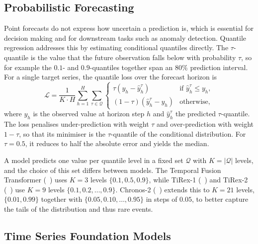 \subsection{Probabilistic Forecasting}
\label{sec:rw_quantiles}

Point forecasts do not express how uncertain a prediction is, which is essential for decision making and for downstream tasks such as anomaly detection. Quantile regression addresses this by estimating conditional quantiles directly. The $\tau$-quantile is the value that the future observation falls below with probability $\tau$, so for example the $0.1$- and $0.9$-quantiles together span an $80\%$ prediction interval. For a single target series, the quantile loss over the forecast horizon is
\begin{equation}
	\mathcal{L} = \frac{1}{K \cdot H} \sum_{h=1}^{H} \sum_{\tau \in \mathcal{Q}}
	\begin{cases}
		\tau \left(y_h - \hat{y}_h^{\tau}\right) & \text{if } \hat{y}_h^{\tau} \le y_h, \\
		(1 - \tau) \left(\hat{y}_h^{\tau} - y_h\right) & \text{otherwise,}
	\end{cases}
	\label{eq:quantile_loss}
\end{equation}
where $y_h$ is the observed value at horizon step $h$ and $\hat{y}_h^{\tau}$ the predicted $\tau$-quantile. The loss penalises under-prediction with weight $\tau$ and over-prediction with weight $1 - \tau$, so that its minimiser is the $\tau$-quantile of the conditional distribution. For $\tau = 0.5$, it reduces to half the absolute error and yields the median.

A model predicts one value per quantile level in a fixed set $\mathcal{Q}$ with $K = |\mathcal{Q}|$ levels, and the choice of this set differs between models. The Temporal Fusion Transformer (\citeauthor{temporalfusiontransformers}~\cite{temporalfusiontransformers}) uses $K = 3$ levels $\{0.1, 0.5, 0.9\}$, while TiRex-1 (\citeauthor{tirex1}~\cite{tirex1}) and TiRex-2 (\citeauthor{tirex2}~\cite{tirex2}) use $K = 9$ levels $\{0.1, 0.2, \hdots, 0.9\}$. Chronos-2 (\citeauthor{chronos2}~\cite{chronos2}) extends this to $K = 21$ levels, $\{0.01, 0.99\}$ together with $\{0.05, 0.10, \hdots, 0.95\}$ in steps of $0.05$, to better capture the tails of the distribution and thus rare events.


\subsection{Time Series Foundation Models}
\label{sec:rw_foundation}

